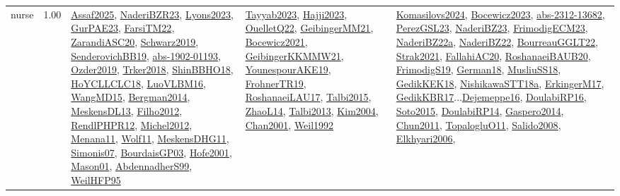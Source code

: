 {\begin{longtable}{p{3cm}r>{\raggedright\arraybackslash}p{6cm}>{\raggedright\arraybackslash}p{6cm}>{\raggedright\arraybackslash}p{8cm}}
\index{nurse}\index{ApplicationAreas!nurse}nurse &  1.00 & \hyperref[detail:Assaf2025]{Assaf2025}, \hyperref[detail:NaderiBZR23]{NaderiBZR23}, \hyperref[detail:Lyons2023]{Lyons2023}, \hyperref[detail:GurPAE23]{GurPAE23}, \hyperref[detail:FarsiTM22]{FarsiTM22}, \hyperref[detail:ZarandiASC20]{ZarandiASC20}, \hyperref[detail:Schwarz2019]{Schwarz2019}, \hyperref[detail:SenderovichBB19]{SenderovichBB19}, \hyperref[detail:abs-1902-01193]{abs-1902-01193}, \hyperref[detail:Ozder2019]{Ozder2019}, \hyperref[detail:Trker2018]{Trker2018}, \hyperref[detail:ShinBBHO18]{ShinBBHO18}, \hyperref[detail:HoYCLLCLC18]{HoYCLLCLC18}, \hyperref[detail:LuoVLBM16]{LuoVLBM16}, \hyperref[detail:WangMD15]{WangMD15}, \hyperref[detail:Bergman2014]{Bergman2014}, \hyperref[detail:MeskensDL13]{MeskensDL13}, \hyperref[detail:Filho2012]{Filho2012}, \hyperref[detail:RendlPHPR12]{RendlPHPR12}, \hyperref[detail:Michel2012]{Michel2012}, \hyperref[detail:Menana11]{Menana11}, \hyperref[detail:Wolf11]{Wolf11}, \hyperref[detail:MeskensDHG11]{MeskensDHG11}, \hyperref[detail:Simonis07]{Simonis07}, \hyperref[detail:BourdaisGP03]{BourdaisGP03}, \hyperref[detail:Hofe2001]{Hofe2001}, \hyperref[detail:Mason01]{Mason01}, \hyperref[detail:AbdennadherS99]{AbdennadherS99}, \hyperref[detail:WeilHFP95]{WeilHFP95} & \hyperref[detail:Tayyab2023]{Tayyab2023}, \hyperref[detail:Hajji2023]{Hajji2023}, \hyperref[detail:OuelletQ22]{OuelletQ22}, \hyperref[detail:GeibingerMM21]{GeibingerMM21}, \hyperref[detail:Bocewicz2021]{Bocewicz2021}, \hyperref[detail:GeibingerKKMMW21]{GeibingerKKMMW21}, \hyperref[detail:YounespourAKE19]{YounespourAKE19}, \hyperref[detail:FrohnerTR19]{FrohnerTR19}, \hyperref[detail:RoshanaeiLAU17]{RoshanaeiLAU17}, \hyperref[detail:Talbi2015]{Talbi2015}, \hyperref[detail:ZhaoL14]{ZhaoL14}, \hyperref[detail:Talbi2013]{Talbi2013}, \hyperref[detail:Kim2004]{Kim2004}, \hyperref[detail:Chan2001]{Chan2001}, \hyperref[detail:Weil1992]{Weil1992} & \hyperref[detail:Komasilovs2024]{Komasilovs2024}, \hyperref[detail:Bocewicz2023]{Bocewicz2023}, \hyperref[detail:abs-2312-13682]{abs-2312-13682}, \hyperref[detail:PerezGSL23]{PerezGSL23}, \hyperref[detail:NaderiBZ23]{NaderiBZ23}, \hyperref[detail:FrimodigECM23]{FrimodigECM23}, \hyperref[detail:NaderiBZ22a]{NaderiBZ22a}, \hyperref[detail:NaderiBZ22]{NaderiBZ22}, \hyperref[detail:BourreauGGLT22]{BourreauGGLT22}, \hyperref[detail:Strak2021]{Strak2021}, \hyperref[detail:FallahiAC20]{FallahiAC20}, \hyperref[detail:RoshanaeiBAUB20]{RoshanaeiBAUB20}, \hyperref[detail:FrimodigS19]{FrimodigS19}, \hyperref[detail:German18]{German18}, \hyperref[detail:MusliuSS18]{MusliuSS18}, \hyperref[detail:GedikKEK18]{GedikKEK18}, \hyperref[detail:NishikawaSTT18a]{NishikawaSTT18a}, \hyperref[detail:ErkingerM17]{ErkingerM17}, \hyperref[detail:GedikKBR17]{GedikKBR17}...\hyperref[detail:Dejemeppe16]{Dejemeppe16}, \hyperref[detail:DoulabiRP16]{DoulabiRP16}, \hyperref[detail:Soto2015]{Soto2015}, \hyperref[detail:DoulabiRP14]{DoulabiRP14}, \hyperref[detail:Gaspero2014]{Gaspero2014}, \hyperref[detail:Chun2011]{Chun2011}, \hyperref[detail:TopalogluO11]{TopalogluO11}, \hyperref[detail:Salido2008]{Salido2008}, \hyperref[detail:Elkhyari2006]{Elkhyari2006}, 
\end{longtable}}

